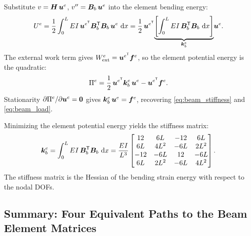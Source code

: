 Substitute $v = \bm{H}\,\bm{u}^e$, $v'' = \bm{B}_b\,\bm{u}^e$
into the element bending energy:
\[
    U^e = \frac{1}{2}\int_0^L EI\,\bm{u}^{e^{\mathsf{T}}}
          \bm{B}_b^{\mathsf{T}}\bm{B}_b\,\bm{u}^e\,\,\mathrm{d} x
        = \frac{1}{2}\,\bm{u}^{e^{\mathsf{T}}}
          \!\underbrace{\left[\int_0^L EI\,\bm{B}_b^{\mathsf{T}}\bm{B}_b\,\,\mathrm{d} x\right]}_{\bm{k}^e_b}
          \!\bm{u}^e .
\]
The external work term gives $W^e_{\mathrm{ext}} = \bm{u}^{e^{\mathsf{T}}}\bm{f}^e$,
so the element potential energy is the quadratic:
\begin{equation}
    \Pi^e = \frac{1}{2}\,\bm{u}^{e^{\mathsf{T}}}\bm{k}^e_b\,\bm{u}^e
            - \bm{u}^{e^{\mathsf{T}}}\bm{f}^e .
    \label{eq:beam_pmpe_tpe_element}
\end{equation}
Stationarity $\partial\Pi^e/\partial\bm{u}^e = \bm{0}$ gives
$\bm{k}^e_b\,\bm{u}^e = \bm{f}^e$, recovering \cref{eq:beam_stiffness}
and \cref{eq:beam_load}.

\begin{importantbox}
Minimizing the element potential energy yields the stiffness matrix:
\[
    \bm{k}^e_b
    = \int_0^L EI\,\bm{B}_b^{\mathsf{T}}\bm{B}_b\,\,\mathrm{d} x
    = \frac{EI}{L^3}
    \begin{bmatrix}
        12 & 6L & -12 & 6L \\ 6L & 4L^2 & -6L & 2L^2 \\
       -12 & -6L & 12 & -6L \\ 6L & 2L^2 & -6L & 4L^2
    \end{bmatrix} .
\]
The stiffness matrix is the Hessian of the bending strain energy with
respect to the nodal DOFs.
\end{importantbox}

\subsection{Summary: Four Equivalent Paths to the Beam Element Matrices}
\label{sec:beam_pmpe_summary}


